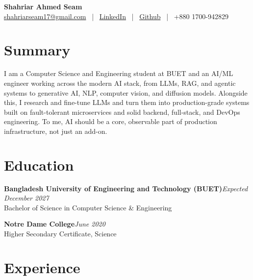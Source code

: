 \documentclass[a4paper,11pt]{article}
\begin{document}
\begin{center}
    {\Large \textbf{Shahriar Ahmed Seam}}\\[4pt]
    \small
    \href{mailto:shahriarseam17@gmail.com}{shahriarseam17@gmail.com} \ | \
    \href{https://www.linkedin.com/in/shahriar-ahmed-seam/}{LinkedIn} \ | \
    \href{https://github.com/shahriar-ahmed-seam}{Github} \ | \
    {+880 1700-942829}
\end{center}

\section{Summary}
I am a Computer Science and Engineering student at BUET and an AI/ML engineer working across the
modern AI stack, from LLMs, RAG, and agentic systems to generative AI, NLP, computer vision, and
diffusion models. Alongside this, I research and fine-tune LLMs and turn them into production-grade
systems built on fault-tolerant microservices and solid backend, full-stack, and DevOps engineering.
To me, AI should be a core, observable part of production infrastructure, not just an add-on.

\section{Education}

\textbf{Bangladesh University of Engineering and Technology (BUET)}\hfill\textit{Expected December 2027}\\[1pt]
Bachelor of Science in Computer Science \& Engineering\par\vspace{3pt}

\textbf{Notre Dame College}\hfill\textit{June 2020}\\[1pt]
Higher Secondary Certificate, Science\par\vspace{1pt}

\section{Experience}
\end{document}
